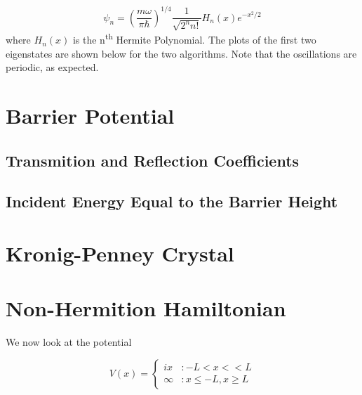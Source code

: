 \documentclass{article}
\begin{document}
\begin{equation}
\psi_n = \left( \frac{m \omega}{\pi \hbar} \right)^{1/4} \frac{1}{\sqrt{2^n n!}} H_n(x)e^{-x^2/2}
\end{equation}
%
where $H_n(x)$ is the n\textsuperscript{th}  Hermite Polynomial. The plots of the first two eigenstates are shown below for the two algorithms.
Note that the oscillations are periodic, as expected.


\section{Barrier Potential}

\subsection{Transmition and Reflection Coefficients}

\subsection{Incident Energy Equal to the Barrier Height}

\section{Kronig-Penney Crystal}

\section{Non-Hermition Hamiltonian}

We now look at the potential 

\[V(x) = \left\{
  \begin{array}{lr}
    ix &  : -L < x < < L \\
    \infty & : x \leq -L , x \geq L 
  \end{array}
\right.
\]
\end{document}
